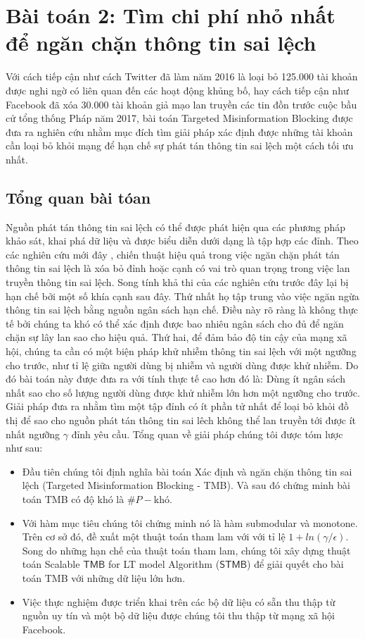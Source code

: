 \section{Bài toán 2: Tìm chi phí nhỏ nhất để ngăn chặn thông tin sai lệch}

Với cách tiếp cận như cách Twitter đã làm năm 2016 là loại bỏ 125.000 tài khoản được nghi ngờ có liên quan đến các hoạt động khủng bố, hay cách tiếp cận như Facebook đã xóa 30.000 tài khoản giả mạo lan truyền các tin đồn trước cuộc bầu cử tổng thống Pháp năm 2017, bài toán Targeted Misinformation Blocking được đưa ra nghiên cứu nhằm mục đích tìm giải pháp xác định được những tài khoản cần loại bỏ khỏi mạng để hạn chế sự phát tán thông tin sai lệch một cách tối ưu nhất.

\subsection{Tổng quan bài tóan}
Nguồn phát tán thông tin sai lệch có thể được phát hiện qua các phương pháp khảo sát, khai phá dữ liệu \cite{qazvin, kwon} và được biểu diễn dưới dạng là tập hợp các đỉnh. Theo các nghiên cứu mới đây \cite{khali, tong, pra}, chiến thuật hiệu quả trong việc ngăn chặn phát tán thông tin sai lệch là xóa bỏ đỉnh hoặc cạnh có vai trò quan trọng trong việc lan truyền thông tin sai lệch. Song tính khả thi của các nghiên cứu trước đây lại bị hạn chế bởi một số khía cạnh sau đây. Thứ nhất họ tập trung vào việc ngăn ngừa thông tin sai lệch bằng nguồn ngân sách hạn chế. Điều này rõ ràng là không thực tế bởi chúng ta khó có thể xác định được bao nhiêu ngân sách cho đủ để ngăn chặn sự lây lan sao cho hiệu quả. Thứ hai, để đảm bảo độ tin cậy của mạng xã hội, chúng ta cần có một biện pháp khử nhiễm thông tin sai lệch với một ngưỡng cho trước, như tỉ lệ giữa người dùng bị nhiễm và người dùng được khử nhiễm. Do đó bài toán này được đưa ra với tính thực tế cao hơn đó là: Dùng ít ngân sách nhất sao cho số lượng người dùng được khử nhiễm lớn hơn một ngưỡng cho trước. Giải pháp đưa ra nhằm tìm một tập đỉnh có ít phần tử nhất để loại bỏ khỏi đồ thị để sao cho nguồn phát tán thông tin sai lêch không thể lan truyền tới được ít nhất ngưỡng $\gamma$ đỉnh yêu cầu. Tổng quan về giải pháp chúng tôi được tóm lược như sau:
\begin{itemize}
	\item Đầu tiên chúng tôi định nghĩa bài toán Xác định và ngăn chặn thông tin sai lệch (Targeted Misinformation Blocking - TMB). Và sau đó chứng minh bài toán TMB có độ khó là $\#P-\text{khó}$.
	\item Với hàm mục tiêu chúng tôi chứng minh nó là hàm submodular và monotone. Trên cơ sở đó, đề xuất một thuật toán tham lam với với tỉ lệ $1+ln(\gamma/\epsilon)$. Song do những hạn chế của thuật toán tham lam, chúng tôi xây dựng thuật toán Scalable $\mathsf{TMB}$ for LT model Algorithm ($\mathsf{STMB}$) để giải quyết cho bài toán TMB với những dữ liệu lớn hơn. 
	\item Việc thực nghiệm được triển khai trên các bộ dữ liệu có sẵn thu thập từ nguồn uy tín và một bộ dữ liệu được chúng tôi thu thập từ mạng xã hội Facebook. 
\end{itemize}

